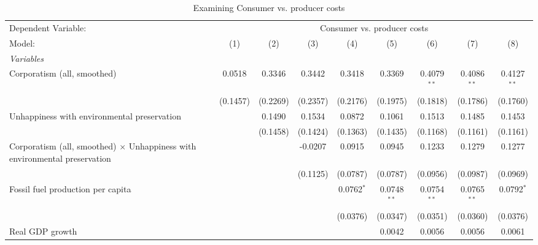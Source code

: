 
\begin{table}[htbp]
   \caption{Examining Consumer vs. producer costs}
   \centering
   \begin{tabular}{lcccccccc}
      \tabularnewline \midrule \midrule
      Dependent Variable: & \multicolumn{8}{c}{Consumer vs. producer costs}\\
      Model:                                                                            & (1)      & (2)      & (3)      & (4)          & (5)           & (6)           & (7)           & (8)\\  
      \midrule
      \emph{Variables}\\
      Corporatism (all, smoothed)                                                       & 0.0518   & 0.3346   & 0.3442   & 0.3418       & 0.3369        & 0.4079$^{**}$ & 0.4086$^{**}$ & 0.4127$^{**}$\\   
                                                                                        & (0.1457) & (0.2269) & (0.2357) & (0.2176)     & (0.1975)      & (0.1818)      & (0.1786)      & (0.1760)\\   
      Unhappiness with environmental preservation                                       &          & 0.1490   & 0.1534   & 0.0872       & 0.1061        & 0.1513        & 0.1485        & 0.1453\\   
                                                                                        &          & (0.1458) & (0.1424) & (0.1363)     & (0.1435)      & (0.1168)      & (0.1161)      & (0.1161)\\   
      Corporatism (all, smoothed) $\times$ Unhappiness with environmental preservation  &          &          & -0.0207  & 0.0915       & 0.0945        & 0.1233        & 0.1279        & 0.1277\\   
                                                                                        &          &          & (0.1125) & (0.0787)     & (0.0787)      & (0.0956)      & (0.0987)      & (0.0969)\\   
      Fossil fuel production per capita                                                 &          &          &          & 0.0762$^{*}$ & 0.0748$^{**}$ & 0.0754$^{**}$ & 0.0765$^{**}$ & 0.0792$^{*}$\\   
                                                                                        &          &          &          & (0.0376)     & (0.0347)      & (0.0351)      & (0.0360)      & (0.0376)\\   
      Real GDP growth                                                                   &          &          &          &              & 0.0042        & 0.0056        & 0.0056        & 0.0061\\   

\end{tabular}
\end{table}
